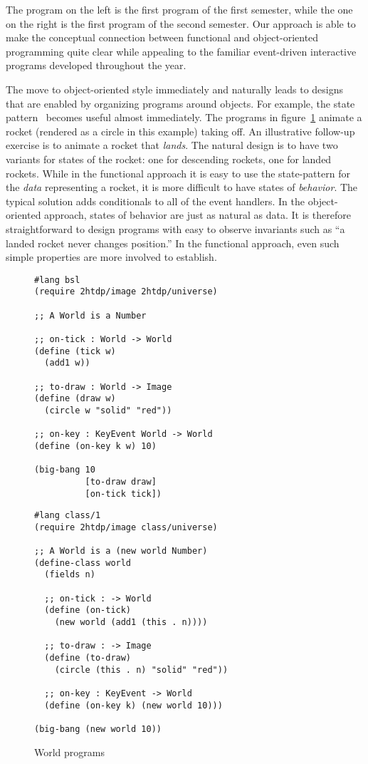 \documentclass[submission,copyright]{eptcs}
\begin{document}
The program on the left is the first program of the first semester,
while the one on the right is the first program of the second
semester.  Our approach is able to make the conceptual connection
between functional and object-oriented programming quite clear while
appealing to the familiar event-driven interactive programs developed
throughout the year.

The move to object-oriented style immediately and naturally leads to
designs that are enabled by organizing programs around objects.  For
example, the state pattern~\cite{samth:GOF} becomes useful almost
immediately.  The programs in figure~\ref{fig:world} animate a rocket
(rendered as a circle in this example) taking off.  An illustrative
follow-up exercise is to animate a rocket that \emph{lands}.  The
natural design is to have two variants for states of the rocket: one
for descending rockets, one for landed rockets.  While in the
functional approach it is easy to use the state-pattern for the
\emph{data} representing a rocket, it is more difficult to have states
of \emph{behavior}.  The typical solution adds conditionals to all of
the event handlers.  In the object-oriented approach, states of
behavior are just as natural as data.  It is therefore straightforward
to design programs with easy to observe invariants such as ``a landed
rocket never changes position.''  In the functional approach, even
such simple properties are more involved to establish.

\begin{figure}
\begin{minipage}[t]{3.4in}
\begin{verbatim}
#lang bsl
(require 2htdp/image 2htdp/universe)

;; A World is a Number

;; on-tick : World -> World
(define (tick w)
  (add1 w))

;; to-draw : World -> Image
(define (draw w)
  (circle w "solid" "red"))

;; on-key : KeyEvent World -> World
(define (on-key k w) 10)

(big-bang 10
          [to-draw draw]
          [on-tick tick])
\end{verbatim}
\end{minipage}
\begin{minipage}[t]{3in}
\begin{verbatim}
#lang class/1
(require 2htdp/image class/universe)

;; A World is a (new world Number)
(define-class world
  (fields n)

  ;; on-tick : -> World
  (define (on-tick)
    (new world (add1 (this . n))))

  ;; to-draw : -> Image
  (define (to-draw) 
    (circle (this . n) "solid" "red"))

  ;; on-key : KeyEvent -> World
  (define (on-key k) (new world 10)))
  
(big-bang (new world 10))
\end{verbatim}
\end{minipage}
\caption{World programs}
\label{fig:world}
\end{figure}
\end{document}
